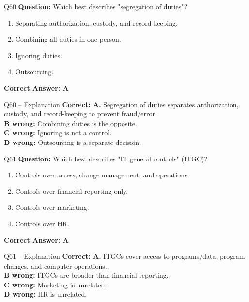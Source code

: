 \documentclass[aspectratio=169,10pt]{beamer}
\begin{document}
	\begin{frame}[t]{Q60}
		\small
		\textbf{Question:} Which best describes "segregation of duties"?
		\begin{enumerate}[label=\Alph*.,itemsep=1pt,topsep=2pt]
			\item Separating authorization, custody, and record-keeping.
			\item Combining all duties in one person.
			\item Ignoring duties.
			\item Outsourcing.
		\end{enumerate}
		\vspace{4pt}
		\textbf{Correct Answer: A}
	\end{frame}
	
	\begin{frame}[t]{Q60 -- Explanation}
		\small
		\textbf{Correct: A.} Segregation of duties separates authorization, custody, and record-keeping to prevent fraud/error. \\[4pt]
		\textbf{B wrong:} Combining duties is the opposite. \\[2pt]
		\textbf{C wrong:} Ignoring is not a control. \\[2pt]
		\textbf{D wrong:} Outsourcing is a separate decision.
	\end{frame}
	
	\begin{frame}[t]{Q61}
		\small
		\textbf{Question:} Which best describes "IT general controls" (ITGC)?
		\begin{enumerate}[label=\Alph*.,itemsep=1pt,topsep=2pt]
			\item Controls over access, change management, and operations.
			\item Controls over financial reporting only.
			\item Controls over marketing.
			\item Controls over HR.
		\end{enumerate}
		\vspace{4pt}
		\textbf{Correct Answer: A}
	\end{frame}
	
	\begin{frame}[t]{Q61 -- Explanation}
		\small
		\textbf{Correct: A.} ITGCs cover access to programs/data, program changes, and computer operations. \\[4pt]
		\textbf{B wrong:} ITGCs are broader than financial reporting. \\[2pt]
		\textbf{C wrong:} Marketing is unrelated. \\[2pt]
		\textbf{D wrong:} HR is unrelated.
	\end{frame}
	
\end{document}
